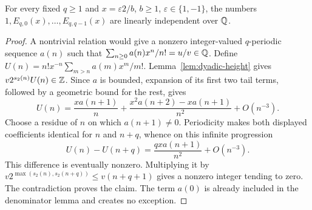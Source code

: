 \begin{lemma}\label{lem:periodic-exp}
For every fixed $q\geq1$ and $x=\varepsilon2/b$, $b\geq1$,
$\varepsilon\in\{1,-1\}$, the numbers
$1,E_{q,0}(x),\ldots,E_{q,q-1}(x)$ are linearly independent over $\mathbb Q$.
\end{lemma}
\begin{proof}
A nontrivial relation would give a nonzero integer-valued $q$-periodic
sequence $a(n)$ such that $\sum_{n\geq0}a(n)x^n/n!=u/v\in\mathbb Q$.
Define $U(n)=n!x^{-n}\sum_{m>n}a(m)x^m/m!$.
Lemma~\ref{lem:dyadic-height} gives
$v2^{s_2(n)}U(n)\in\mathbb Z$. Since $a$ is bounded, expansion of its first
two tail terms, followed by a geometric bound for the rest, gives
\[
 U(n)=\frac{x a(n+1)}n+
 \frac{x^2a(n+2)-xa(n+1)}{n^2}+O(n^{-3}).
\]
Choose a residue of $n$ on which $a(n+1)\ne0$.
Periodicity makes both displayed coefficients identical for $n$ and
$n+q$, whence on this infinite progression
\[
 U(n)-U(n+q)=\frac{qx a(n+1)}{n^2}+O(n^{-3}).
\]
This difference is eventually nonzero. Multiplying it by
$v2^{\max(s_2(n),s_2(n+q))}\leq v(n+q+1)$ gives a nonzero integer
tending to zero. The contradiction proves the claim. The term $a(0)$
is already included in the denominator lemma and creates no exception.
\end{proof}

